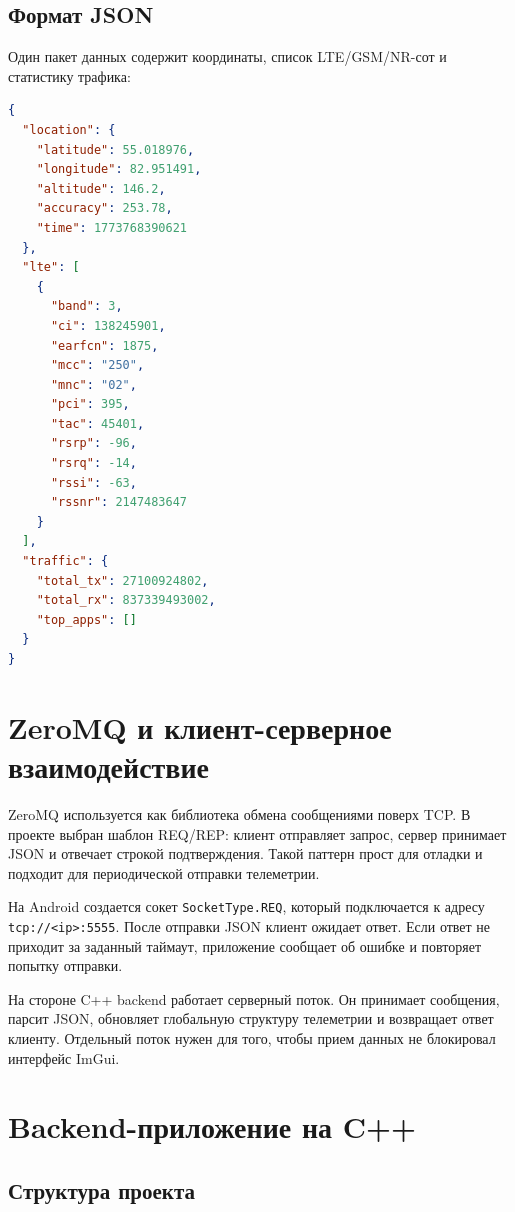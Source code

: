 \documentclass[14pt,a4paper]{extarticle}
\begin{document}
\subsection{Формат JSON}

Один пакет данных содержит координаты, список LTE/GSM/NR-сот и статистику трафика:

\begin{lstlisting}[language=json,caption={Пример JSON-пакета Android-приложения}]
{
  "location": {
    "latitude": 55.018976,
    "longitude": 82.951491,
    "altitude": 146.2,
    "accuracy": 253.78,
    "time": 1773768390621
  },
  "lte": [
    {
      "band": 3,
      "ci": 138245901,
      "earfcn": 1875,
      "mcc": "250",
      "mnc": "02",
      "pci": 395,
      "tac": 45401,
      "rsrp": -96,
      "rsrq": -14,
      "rssi": -63,
      "rssnr": 2147483647
    }
  ],
  "traffic": {
    "total_tx": 27100924802,
    "total_rx": 837339493002,
    "top_apps": []
  }
}
\end{lstlisting}

\section{ZeroMQ и клиент-серверное взаимодействие}

ZeroMQ используется как библиотека обмена сообщениями поверх TCP. В проекте выбран шаблон REQ/REP: клиент отправляет запрос, сервер принимает JSON и отвечает строкой подтверждения. Такой паттерн прост для отладки и подходит для периодической отправки телеметрии.

На Android создается сокет \texttt{SocketType.REQ}, который подключается к адресу \texttt{tcp://<ip>:5555}. После отправки JSON клиент ожидает ответ. Если ответ не приходит за заданный таймаут, приложение сообщает об ошибке и повторяет попытку отправки.

На стороне C++ backend работает серверный поток. Он принимает сообщения, парсит JSON, обновляет глобальную структуру телеметрии и возвращает ответ клиенту. Отдельный поток нужен для того, чтобы прием данных не блокировал интерфейс ImGui.

\section{Backend-приложение на C++}

\subsection{Структура проекта}
\end{document}
